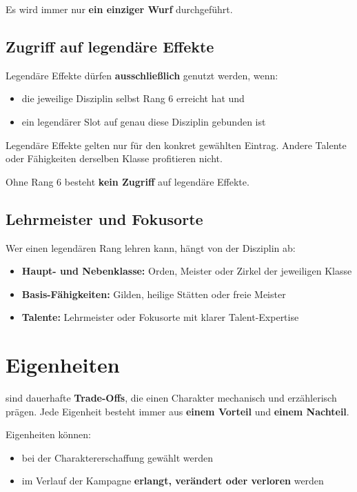 Es wird immer nur \textbf{ein einziger Wurf} durchgeführt.

\subsection*{Zugriff auf legendäre Effekte}

Legendäre Effekte dürfen \textbf{ausschließlich} genutzt werden, wenn:
\begin{itemize}
	\item die jeweilige Disziplin selbst Rang 6 erreicht hat und
	\item ein legendärer Slot auf genau diese Disziplin gebunden ist
\end{itemize}

Legendäre Effekte gelten nur für den konkret gewählten Eintrag.
Andere Talente oder Fähigkeiten derselben Klasse profitieren nicht.

Ohne Rang 6 besteht \textbf{kein Zugriff} auf legendäre Effekte.

\subsection*{Lehrmeister und Fokusorte}

Wer einen legendären Rang lehren kann, hängt von der Disziplin ab:

\begin{itemize}
	\item \textbf{Haupt- und Nebenklasse:} Orden, Meister oder Zirkel der jeweiligen Klasse
	\item \textbf{Basis-Fähigkeiten:} Gilden, heilige Stätten oder freie Meister
	\item \textbf{Talente:} Lehrmeister oder Fokusorte mit klarer Talent-Expertise
\end{itemize}


\section{Eigenheiten}

 sind dauerhafte \textbf{Trade-Offs}, die einen Charakter
mechanisch und erzählerisch prägen.  
Jede Eigenheit besteht immer aus \textbf{einem Vorteil} und \textbf{einem Nachteil}.

Eigenheiten können:
\begin{itemize}
	\item bei der Charaktererschaffung gewählt werden
	\item im Verlauf der Kampagne \textbf{erlangt, verändert oder verloren} werden
\end{itemize}

